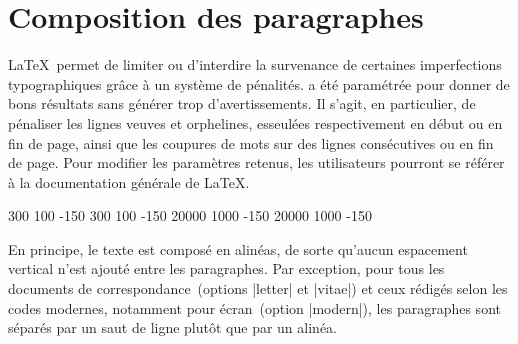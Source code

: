 \begin{noprint}
\raggedbottom
\end{noprint}



\section{Composition des paragraphes}

\LaTeX\ permet de limiter ou d'interdire la survenance de certaines imperfections typographiques grâce à un système de pénalités. \frenchlaw a été paramétrée pour donner de bons résultats sans générer trop d'avertissements. Il s'agit, en particulier, de pénaliser les lignes veuves et orphelines, esseulées respectivement en début ou en fin de page, ainsi que les coupures de mots sur des lignes consécutives ou en fin de page. Pour modifier les paramètres retenus, les utilisateurs pourront se référer à la documentation générale de \LaTeX.

\begin{noprint}
\if@twocolumn
	 300 100 -150 %
	 300 100 -150 %
\else
	 20000 1000 -150 %
	 20000 1000 -150 %
\fi
{} %
\end{noprint}

En principe, le texte est composé en alinéas, de sorte qu'aucun espacement vertical n'est ajouté entre les paragraphes. Par exception, pour tous les documents de correspondance~(options |letter| et |vitae|) et ceux rédigés selon les codes modernes, notamment pour écran~(option |modern|), les paragraphes sont séparés par un saut de ligne plutôt que par un alinéa.

\begin{noprint}
\if@stationery
	\setlength{\parskip}{\baselineskip}
	\setlength{\parindent}{\z@}
\else\if@modern
	\setlength{\parskip}{\baselineskip}
	\setlength{\parindent}{\z@}
\else
	\setlength{\parskip}{\z@}
	\setlength{\parindent}{1.5em}
\fi\fi
\end{noprint}

